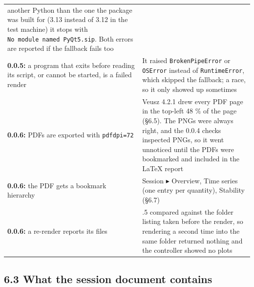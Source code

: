 \documentclass[
\directlua{luaotfload.add_fallback("qsfallback", {"DejaVu Sans:mode=harf;", "DejaVu Sans Mono:mode=harf;", "DejaVu Math TeX Gyre:mode=harf;"})}
  10pt,
  letterpaper,
]{article}
\begin{document}
\begin{longtable}[]{@{}
  >{\raggedright\arraybackslash}p{}
  >{\raggedright\arraybackslash}p{}@{}}
another Python than the one the package was built for (3.13 instead of
3.12 in the test machine) it stops with
\texttt{No\ module\ named\ \textquotesingle{}PyQt5.sip\textquotesingle{}}.
Both errors are reported if the fallback fails too \\
\textbf{0.0.5:} a program that exits before reading its script, or
cannot be started, is a failed render & It raised
\texttt{BrokenPipeError} or \texttt{OSError} instead of
\texttt{RuntimeError}, which skipped the fallback; a race, so it only
showed up sometimes \\
\textbf{0.0.6:} PDFs are exported with \texttt{pdfdpi=72} & Veusz 4.2.1
drew every PDF page in the top-left 48 \% of the page (§6.5). The PNGs
were always right, and the 0.0.4 checks inspected PNGs, so it went
unnoticed until the PDFs were bookmarked and included in the LaTeX
report \\
\textbf{0.0.6:} the PDF gets a bookmark hierarchy & Session ▸ Overview,
Time series (one entry per quantity), Stability (§6.7) \\
\textbf{0.0.6:} a re-render reports its files & 0.0.5 compared against
the folder listing taken before the render, so rendering a second time
into the same folder returned nothing and the controller showed no
plots \\
\end{longtable}

\hypertarget{what-the-session-document-contains}{%
\subsection{6.3 What the session document
contains}\label{what-the-session-document-contains}}
\end{document}
